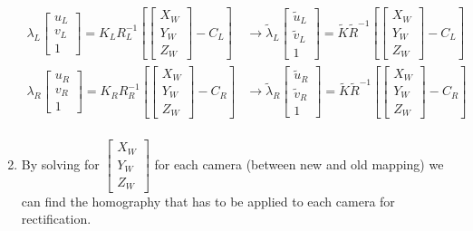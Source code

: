 \documentclass[10pt,a4paper]{scrartcl}
\begin{document}
\begin{multicols*}{2}
\begin{enumerate}
\begin{align*}
\lambda_L\begin{bmatrix}
u_L\\v_L\\1
\end{bmatrix}=K_LR_L^{-1}\left[\begin{bmatrix}
X_W\\Y_W\\Z_W
\end{bmatrix}-C_L\right]&\rightarrow
\tilde{\lambda}_L\begin{bmatrix}
\tilde{u}_L\\\tilde{v}_L\\1
\end{bmatrix}=\tilde{K}\tilde{R}^{-1}\left[\begin{bmatrix}
X_W\\Y_W\\Z_W
\end{bmatrix}-C_L\right]\\
\lambda_R\begin{bmatrix}
u_R\\v_R\\1
\end{bmatrix}=K_RR_R^{-1}\left[\begin{bmatrix}
X_W\\Y_W\\Z_W
\end{bmatrix}-C_R\right]&\rightarrow
\tilde{\lambda}_R\begin{bmatrix}
\tilde{u}_R\\\tilde{v}_R\\1
\end{bmatrix}=\tilde{K}\tilde{R}^{-1}\left[\begin{bmatrix}
X_W\\Y_W\\Z_W
\end{bmatrix}-C_R\right]\\
\end{align*}
\item By solving for $\begin{bmatrix}
X_W\\Y_W\\Z_W
\end{bmatrix}$ for each camera (between new and old mapping) we can find the homography that has to be applied to each camera for rectification.


\end{enumerate}
\end{multicols*}
\end{document}
